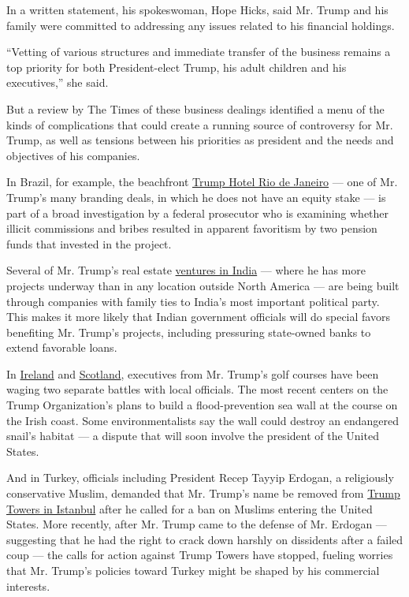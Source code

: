 In a written statement, his spokeswoman, Hope Hicks, said Mr. Trump and
his family were committed to addressing any issues related to his
financial holdings.

``Vetting of various structures and immediate transfer of the business
remains a top priority for both President-elect Trump, his adult
children and his executives,'' she said.

But a review by The Times of these business dealings identified a menu
of the kinds of complications that could create a running source of
controversy for Mr. Trump, as well as tensions between his priorities as
president and the needs and objectives of his companies.

In Brazil, for example, the beachfront
\href{https://www.trumphotels.com/rio-de-janeiro}{Trump Hotel Rio de
Janeiro} --- one of Mr. Trump's many branding deals, in which he does
not have an equity stake --- is part of a broad investigation by a
federal prosecutor who is examining whether illicit commissions and
bribes resulted in apparent favoritism by two pension funds that
invested in the project.

Several of Mr. Trump's real estate
\href{http://www.trump.com/real-estate-portfolio/india/trump-towers-pune/}{ventures
in India} --- where he has more projects underway than in any location
outside North America --- are being built through companies with family
ties to India's most important political party. This makes it more
likely that Indian government officials will do special favors
benefiting Mr. Trump's projects, including pressuring state-owned banks
to extend favorable loans.

In \href{http://www.trumpgolfireland.com/}{Ireland} and
\href{http://www.trumpgolfscotland.com/}{Scotland}, executives from Mr.
Trump's golf courses have been waging two separate battles with local
officials. The most recent centers on the Trump Organization's plans to
build a flood-prevention sea wall at the course on the Irish coast. Some
environmentalists say the wall could destroy an endangered snail's
habitat --- a dispute that will soon involve the president of the United
States.

And in Turkey, officials including President Recep Tayyip Erdogan, a
religiously conservative Muslim, demanded that Mr. Trump's name be
removed from
\href{http://www.trump.com/real-estate-portfolio/istanbul/trump-towers/}{Trump
Towers in Istanbul} after he called for a ban on Muslims entering the
United States. More recently, after Mr. Trump came to the defense of Mr.
Erdogan --- suggesting that he had the right to crack down harshly on
dissidents after a failed coup --- the calls for action against Trump
Towers have stopped, fueling worries that Mr. Trump's policies toward
Turkey might be shaped by his commercial interests.

